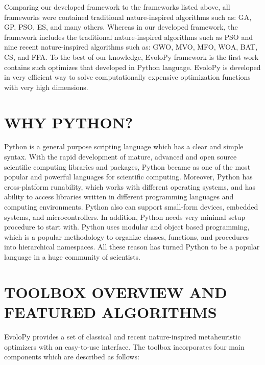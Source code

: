 \documentclass[a4paper,twoside]{article}
\begin{document}
Comparing our developed framework to the frameworks listed above, all frameworks were contained traditional nature-inspired algorithms such as: GA, GP, PSO, ES, and many others. Whereas in our developed framework, the framework includes the traditional nature-inspired algorithms such as PSO and nine recent nature-inspired algorithms such as: GWO, MVO, MFO, WOA, BAT, CS, and FFA. To the best of our knowledge, EvoloPy framework is the first work contains such optimizes that developed in Python language. EvoloPy is developed in very efficient way to solve computationally expensive optimization functions with very high dimensions.


\section{\uppercase{Why Python?}}

Python is a general purpose scripting language which has a clear and simple syntax. With the rapid development of mature, advanced  and open source scientific computing libraries and packages, Python became as one of the most popular and powerful languages for scientific computing.
Moreover, Python has cross-platform runability, which works with different operating systems, and has ability to access libraries written in different programming languages and computing environments. Python also can support small-form devices, embedded systems, and microcontrollers. In addition, Python needs very minimal setup procedure to start with. Python uses modular and object based programming, which is a popular methodology to organize classes, functions, and procedures into hierarchical namespaces. All these reason has turned Python to be a popular language in a huge community of scientists. 

\section{\uppercase{Toolbox Overview and Featured algorithms}}

EvoloPy provides a set of classical and recent nature-inspired metaheuristic optimizers with an easy-to-use interface. The toolbox incorporates four main components which are described as follows: 
\end{document}
